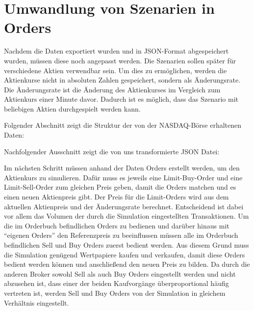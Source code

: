 \section{Umwandlung von Szenarien in Orders}
Nachdem die Daten exportiert wurden und in JSON-Format abgespeichert wurden, müssen diese noch angepasst werden.
Die Szenarien sollen später für verschiedene Aktien verwendbar sein. Um dies zu ermöglichen, werden die Aktienkurse nicht in 
absoluten Zahlen gespeichert, sondern als Änderungsrate.
Die Änderungsrate ist die Änderung des Aktienkurses im Vergleich zum Aktienkurs einer Minute davor.
Dadurch ist es möglich, dass das Szenario mit beliebigen Aktien durchgespielt werden kann.

Folgender Abschnitt zeigt die Struktur der von der NASDAQ-Börse erhaltenen Daten:


\clearpage

Nachfolgender Ausschnitt zeigt die von uns transformierte JSON Datei:


Im nächsten Schritt müssen anhand der Daten Orders erstellt werden, um den Aktienkurs zu simulieren. Dafür muss es jeweils eine Limit-Buy-Order und eine Limit-Sell-Order zum gleichen Preis geben, damit die Orders matchen und es einen neuen Aktienpreis gibt. Der Preis für die Limit-Orders wird aus dem aktuellen Aktienpreis und der Änderungsrate berechnet. Entscheidend ist dabei vor allem das Volumen der durch die Simulation eingestellten Transaktionen.
Um die im Orderbuch befindlichen Orders zu bedienen und darüber hinaus mit \enquote{eigenen Orders} den Referenzpreis zu beeinflussen müssen alle im Orderbuch befindlichen Sell und Buy Orders zuerst bedient werden.
Aus diesem Grund muss die Simulation genügend Wertpapiere kaufen und verkaufen, damit diese Orders bedient werden können und anschließend den neuen Preis zu bilden.
Da durch die anderen Broker sowohl Sell als auch Buy Orders eingestellt werden und nicht abzusehen ist, dass einer der beiden Kaufvorgänge überproportional häufig vertreten ist, werden Sell und Buy Orders von der Simulation in gleichem Verhältnis eingestellt. 


